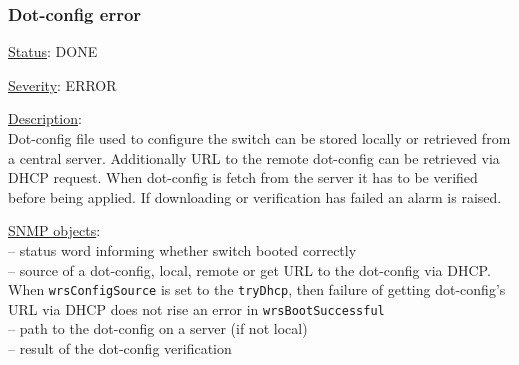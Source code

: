 \subsubsection{\bf Dot-config error}
		\label{fail:other:dot-config}
		\begin{packed_enum}
			\item [] \underline{Status}: DONE
			\item [] \underline{Severity}: ERROR
			\item [] \underline{Description}:\\
				Dot-config file used to configure the switch can be stored locally or
				retrieved from a central server. Additionally URL to the remote dot-config
				can be retrieved via DHCP request. When dot-config is fetch from the server
				it has to be verified before being applied. If downloading or verification has
				failed an alarm is raised.
			\item [] \underline{SNMP objects}:\\
				 -- status word informing
					whether switch booted correctly\\
				 -- source of a dot-config,
					local, remote or get URL to the dot-config via DHCP. When
					\texttt{wrsConfigSource} is set to the \texttt{tryDhcp}, then failure of
					getting dot-config's URL via DHCP does not rise an error in
					\texttt{wrsBootSuccessful}\\
				 -- path to the dot-config
					on a server (if not local)\\
				 -- result of the dot-config verification
		\end{packed_enum}

